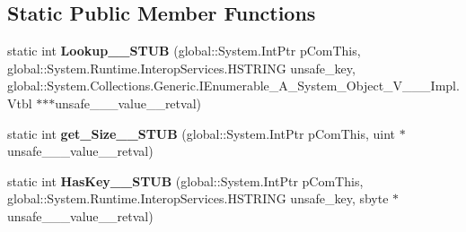 \subsection*{Static Public Member Functions}
\begin{DoxyCompactItemize}
\item 
\mbox{\label{struct_system_1_1_collections_1_1_generic_1_1_i_dictionary___a__string__j___system___collectionsedc27740e4e948ffc8828d48179ed85a_a5599d7b6dbfa547f31e442c88263bc27}} 
static int {\bfseries Lookup\+\_\+\+\_\+\+S\+T\+UB} (global\+::\+System.\+Int\+Ptr p\+Com\+This, global\+::\+System.\+Runtime.\+Interop\+Services.\+H\+S\+T\+R\+I\+NG unsafe\+\_\+key, global\+::\+System.\+Collections.\+Generic.\+I\+Enumerable\+\_\+\+A\+\_\+\+System\+\_\+\+Object\+\_\+\+V\+\_\+\+\_\+\+\_\+\+Impl.\+Vtbl $\ast$$\ast$$\ast$unsafe\+\_\+\+\_\+\+\_\+value\+\_\+\+\_\+retval)
\item 
\mbox{\label{struct_system_1_1_collections_1_1_generic_1_1_i_dictionary___a__string__j___system___collectionsedc27740e4e948ffc8828d48179ed85a_a3a5c8f70d1d585c69946de641a8ddef8}} 
static int {\bfseries get\+\_\+\+Size\+\_\+\+\_\+\+S\+T\+UB} (global\+::\+System.\+Int\+Ptr p\+Com\+This, uint $\ast$unsafe\+\_\+\+\_\+\+\_\+value\+\_\+\+\_\+retval)
\item 
\mbox{\label{struct_system_1_1_collections_1_1_generic_1_1_i_dictionary___a__string__j___system___collectionsedc27740e4e948ffc8828d48179ed85a_a60ece21f6e529083c854e0b876b51b55}} 
static int {\bfseries Has\+Key\+\_\+\+\_\+\+S\+T\+UB} (global\+::\+System.\+Int\+Ptr p\+Com\+This, global\+::\+System.\+Runtime.\+Interop\+Services.\+H\+S\+T\+R\+I\+NG unsafe\+\_\+key, sbyte $\ast$unsafe\+\_\+\+\_\+\+\_\+value\+\_\+\+\_\+retval)
\item 
\mbox{\label{struct_system_1_1_collections_1_1_generic_1_1_i_dictionary___a__string__j___system___collectionsedc27740e4e948ffc8828d48179ed85a_a185cae3598daadd7bc2c99b2ac7a7434}} 

\end{DoxyCompactItemize}
